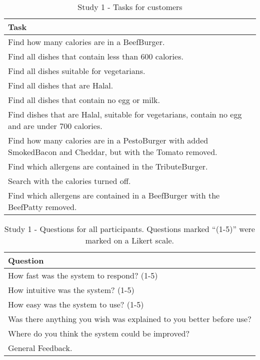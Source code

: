\begin{table}[h]
    \centering
    \begin{tabular}{ |p{\textwidth}| }
    \hline
    \textbf{Task}\\
    \hline
    Find how many calories are in a BeefBurger. \\
    \hline
    Find all dishes that contain less than 600 calories. \\
    \hline
    Find all dishes suitable for vegetarians. \\
    \hline
    Find all dishes that are Halal. \\
    \hline
    Find all dishes that contain no egg or milk. \\
    \hline
    Find dishes that are Halal, suitable for vegetarians, contain no egg and are under 700 calories. \\
    \hline
    Find how many calories are in a PestoBurger with added SmokedBacon and Cheddar, but with the Tomato removed. \\
    \hline
    Find which allergens are contained in the TributeBurger. \\
    \hline
    Search with the calories turned off. \\
    \hline
    Find which allergens are contained in a BeefBurger with the BeefPatty removed. \\
    \hline
    \end{tabular}
    \caption{Study 1 - Tasks for customers}
    \label{tab:Study1TasksC}
\end{table}


\begin{table}[h]
    \centering
    \begin{tabular}{ |p{\textwidth}| }
    \hline
    \textbf{Question}\\
    \hline
    How fast was the system to respond? (1-5) \\
    \hline
    How intuitive was the system? (1-5) \\
    \hline
    How easy was the system to use? (1-5) \\
    \hline
    Was there anything you wish was explained to you better before use? \\
    \hline
    Where do you think the system could be improved? \\
    \hline
    General Feedback. \\
    \hline
    \end{tabular}
    \captionsetup{justification=centering}
    \caption[Study 1 - Questions for all participants]{Study 1 - Questions for all participants. Questions marked ``(1-5)'' were marked on a Likert scale.}
    \label{tab:Study1Questions}
\end{table}


